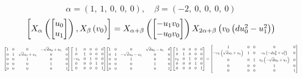 \documentclass[11pt]{article}
\theoremstyle{definition}
\begin{document}
\[
\alpha = \left( 1, \  1, \  0, \  0, \  0\right), \quad \beta = \left( -2, \  0, \  0, \  0, \  0\right)
\]
\[
\scaletoalign{\textwidth}{\left[ X_{\alpha}\left(\left[\begin{matrix}u_{0}\\u_{1}\end{matrix}\right]\right), X_{\beta}\left(v_{0}\right) \right] = X_{\alpha + \beta}\left(\left[\begin{matrix}- u_{1} v_{0}\\- u_{0} v_{0}\end{matrix}\right]\right) X_{2\alpha + \beta}\left(v_{0} \left(d u_{0}^{2} - u_{1}^{2}\right)\right)}
\]
\[
\scaletoalign{\textwidth}{{\left[\begin{matrix}1 & 0 & 0 & - \sqrt{d} u_{0} + u_{1} & 0\\0 & 1 & \sqrt{d} u_{0} + u_{1} & 0 & 0\\0 & 0 & 1 & 0 & 0\\0 & 0 & 0 & 1 & 0\\0 & 0 & 0 & 0 & 1\end{matrix}\right]} {\left[\begin{matrix}1 & 0 & 0 & 0 & 0\\0 & 1 & 0 & 0 & 0\\- v_{0} & 0 & 1 & 0 & 0\\0 & 0 & 0 & 1 & 0\\0 & 0 & 0 & 0 & 1\end{matrix}\right]} {\left[\begin{matrix}1 & 0 & 0 & \sqrt{d} u_{0} - u_{1} & 0\\0 & 1 & - \sqrt{d} u_{0} - u_{1} & 0 & 0\\0 & 0 & 1 & 0 & 0\\0 & 0 & 0 & 1 & 0\\0 & 0 & 0 & 0 & 1\end{matrix}\right]} {\left[\begin{matrix}1 & 0 & 0 & 0 & 0\\0 & 1 & 0 & 0 & 0\\v_{0} & 0 & 1 & 0 & 0\\0 & 0 & 0 & 1 & 0\\0 & 0 & 0 & 0 & 1\end{matrix}\right]} = {\left[\begin{matrix}1 & 0 & 0 & 0 & 0\\- v_{0} \left(\sqrt{d} u_{0} + u_{1}\right) & 1 & 0 & v_{0} \left(- d u_{0}^{2} + u_{1}^{2}\right) & 0\\0 & 0 & 1 & v_{0} \left(- \sqrt{d} u_{0} + u_{1}\right) & 0\\0 & 0 & 0 & 1 & 0\\0 & 0 & 0 & 0 & 1\end{matrix}\right]}}
\]
\end{document}
